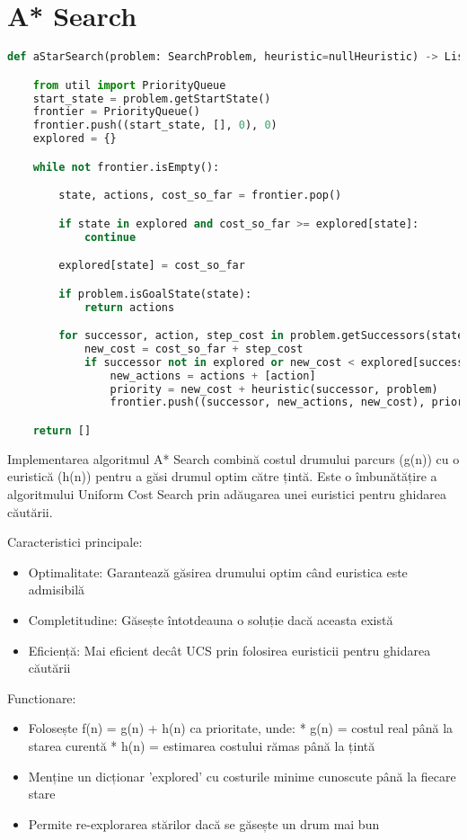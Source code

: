 \documentclass[12pt,a4paper]{article}
\begin{document}
\section{A* Search}
\begin{lstlisting}[language=Python]
def aStarSearch(problem: SearchProblem, heuristic=nullHeuristic) -> List[Directions]:

    from util import PriorityQueue
    start_state = problem.getStartState()
    frontier = PriorityQueue()
    frontier.push((start_state, [], 0), 0)
    explored = {}

    while not frontier.isEmpty():

        state, actions, cost_so_far = frontier.pop()

        if state in explored and cost_so_far >= explored[state]:
            continue

        explored[state] = cost_so_far

        if problem.isGoalState(state):
            return actions

        for successor, action, step_cost in problem.getSuccessors(state):
            new_cost = cost_so_far + step_cost
            if successor not in explored or new_cost < explored[successor]:
                new_actions = actions + [action]
                priority = new_cost + heuristic(successor, problem)
                frontier.push((successor, new_actions, new_cost), priority)

    return []
\end{lstlisting}

Implementarea algoritmul A* Search combină costul drumului parcurs (g(n)) cu o euristică 
(h(n)) pentru a găsi drumul optim către țintă. Este o îmbunătățire a algoritmului Uniform Cost 
Search prin adăugarea unei euristici pentru ghidarea căutării.

Caracteristici principale:
\begin{itemize}
	\item  Optimalitate: Garantează găsirea drumului optim când euristica este admisibilă
  	\item  Completitudine: Găsește întotdeauna o soluție dacă aceasta există
  	\item Eficiență: Mai eficient decât UCS prin folosirea euristicii pentru ghidarea căutării \newline
\end{itemize} 

Functionare:
\begin{itemize}
  	\item  Folosește f(n) = g(n) + h(n) ca prioritate, unde:
		 * g(n) = costul real până la starea curentă
 		* h(n) = estimarea costului rămas până la țintă
	\item Menține un dicționar 'explored' cu costurile minime cunoscute până la fiecare stare
	\item Permite re-explorarea stărilor dacă se găsește un drum mai bun 
\end{itemize}
	
\end{document}
